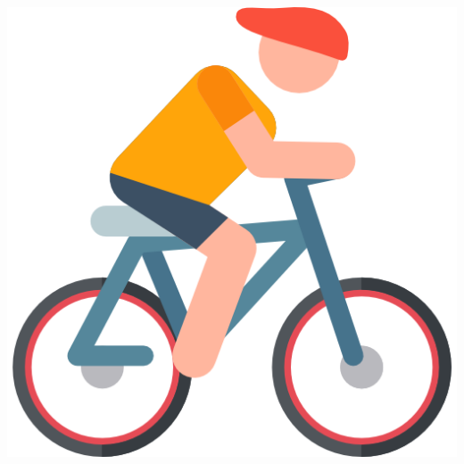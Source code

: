 \begin{tcolorbox}
\begin{spacing}{1.2}
\begin{multicols}{2}
\begin{center}
                \hfill
                \includegraphics[scale=0.055]{figs/cycling.png}
            \end{center}


        \end{multicols}
    \end{spacing}
    \vspace*{-5mm}

\end{tcolorbox}

\vspace*{-6mm}